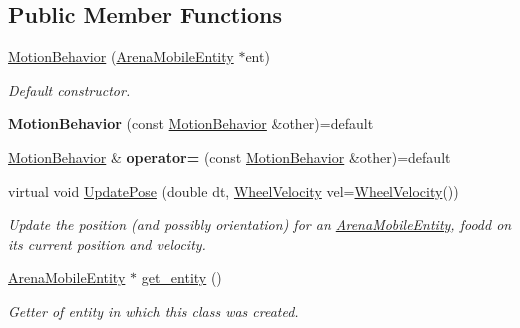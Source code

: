 \subsection*{Public Member Functions}
\begin{DoxyCompactItemize}
\item 
\mbox{\label{class_motion_behavior_aa2d5f7d563f4fdb5702edb8367eaa6e7}} 
\mbox{\hyperlink{class_motion_behavior_aa2d5f7d563f4fdb5702edb8367eaa6e7}{Motion\+Behavior}} (\mbox{\hyperlink{class_arena_mobile_entity}{Arena\+Mobile\+Entity}} $\ast$ent)
\begin{DoxyCompactList}\small\item\em Default constructor. \end{DoxyCompactList}\item 
\mbox{\label{class_motion_behavior_a5fe8e8a49e8cb34519a34ca652a23143}} 
{\bfseries Motion\+Behavior} (const \mbox{\hyperlink{class_motion_behavior}{Motion\+Behavior}} \&other)=default
\item 
\mbox{\label{class_motion_behavior_a227057c1862c64bbc609705205473abc}} 
\mbox{\hyperlink{class_motion_behavior}{Motion\+Behavior}} \& {\bfseries operator=} (const \mbox{\hyperlink{class_motion_behavior}{Motion\+Behavior}} \&other)=default
\item 
virtual void \mbox{\hyperlink{class_motion_behavior_a804f440bb7f03f19abec79a1ab671494}{Update\+Pose}} (double dt, \mbox{\hyperlink{struct_wheel_velocity}{Wheel\+Velocity}} vel=\mbox{\hyperlink{struct_wheel_velocity}{Wheel\+Velocity}}())
\begin{DoxyCompactList}\small\item\em Update the position (and possibly orientation) for an \mbox{\hyperlink{class_arena_mobile_entity}{Arena\+Mobile\+Entity}}, foodd on its current position and velocity. \end{DoxyCompactList}\item 
\mbox{\label{class_motion_behavior_a1daf82b16d312ba6f5f71178e7fafa79}} 
\mbox{\hyperlink{class_arena_mobile_entity}{Arena\+Mobile\+Entity}} $\ast$ \mbox{\hyperlink{class_motion_behavior_a1daf82b16d312ba6f5f71178e7fafa79}{get\+\_\+entity}} ()
\begin{DoxyCompactList}\small\item\em Getter of entity in which this class was created. \end{DoxyCompactList}\end{DoxyCompactItemize}
